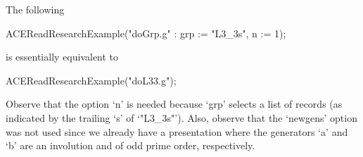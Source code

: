 The following 

\beginexample
ACEReadResearchExample("doGrp.g" : grp := "L3_3s", n := 1);
\endexample

is essentially equivalent to

\beginexample
ACEReadResearchExample("doL33.g");
\endexample

Observe that the option `n' is needed because `grp' selects a list  of
records (as indicated by the trailing `s' of `"L3_3s"'). Also, observe
that the `newgens' option  was  not  used  since  we  already  have  a
presentation where the generators `a' and `b' are an involution and of
odd prime order, respectively. 

